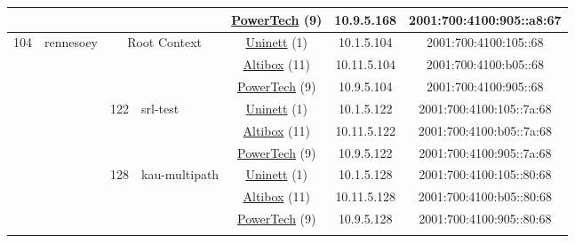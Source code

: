 \begin{small}
\begin{center}
\begin{longtable}{|c|c|c|c|c|c|c|c|}
  &  &  &  & \multicolumn{2}{|c|}{\tiny{\href{http://www.powertech.no}{PowerTech} (9)}} & \tiny{10.9.5.168} & \tiny{2001:700:4100:905::a8:67} \\ \hline
 \multirow{30}{*}{\tiny{104}} & \multicolumn{1}{|l|}{\multirow{30}{*}{\tiny{rennesoey}}} & \multicolumn{2}{|c|}{\multirow{3}{*}{\tiny{Root Context}}} & \multicolumn{2}{|c|}{\tiny{\href{https://www.uninett.no}{Uninett} (1)}} & \tiny{10.1.5.104} & \tiny{2001:700:4100:105::68} \\* \cline{5-5}\cline{6-6}\cline{7-7}\cline{8-8}
  &  & \multicolumn{2}{|c|}{} & \multicolumn{2}{|c|}{\tiny{\href{https://www.altibox.no}{Altibox} (11)}} & \tiny{10.11.5.104} & \tiny{2001:700:4100:b05::68} \\* \cline{5-5}\cline{6-6}\cline{7-7}\cline{8-8}
  &  & \multicolumn{2}{|c|}{} & \multicolumn{2}{|c|}{\tiny{\href{http://www.powertech.no}{PowerTech} (9)}} & \tiny{10.9.5.104} & \tiny{2001:700:4100:905::68} \\* \cline{3-3}\cline{4-4}\cline{5-5}\cline{6-6}\cline{7-7}\cline{8-8}
  &  & \multirow{3}{*}{\tiny{122}} & \multicolumn{1}{|l|}{\multirow{3}{*}{\tiny{srl-test}}} & \multicolumn{2}{|c|}{\tiny{\href{https://www.uninett.no}{Uninett} (1)}} & \tiny{10.1.5.122} & \tiny{2001:700:4100:105::7a:68} \\* \cline{5-5}\cline{6-6}\cline{7-7}\cline{8-8}
  &  &  &  & \multicolumn{2}{|c|}{\tiny{\href{https://www.altibox.no}{Altibox} (11)}} & \tiny{10.11.5.122} & \tiny{2001:700:4100:b05::7a:68} \\* \cline{5-5}\cline{6-6}\cline{7-7}\cline{8-8}
  &  &  &  & \multicolumn{2}{|c|}{\tiny{\href{http://www.powertech.no}{PowerTech} (9)}} & \tiny{10.9.5.122} & \tiny{2001:700:4100:905::7a:68} \\* \cline{3-3}\cline{4-4}\cline{5-5}\cline{6-6}\cline{7-7}\cline{8-8}
  &  & \multirow{3}{*}{\tiny{128}} & \multicolumn{1}{|l|}{\multirow{3}{*}{\tiny{kau-multipath}}} & \multicolumn{2}{|c|}{\tiny{\href{https://www.uninett.no}{Uninett} (1)}} & \tiny{10.1.5.128} & \tiny{2001:700:4100:105::80:68} \\* \cline{5-5}\cline{6-6}\cline{7-7}\cline{8-8}
  &  &  &  & \multicolumn{2}{|c|}{\tiny{\href{https://www.altibox.no}{Altibox} (11)}} & \tiny{10.11.5.128} & \tiny{2001:700:4100:b05::80:68} \\* \cline{5-5}\cline{6-6}\cline{7-7}\cline{8-8}
  &  &  &  & \multicolumn{2}{|c|}{\tiny{\href{http://www.powertech.no}{PowerTech} (9)}} & \tiny{10.9.5.128} & \tiny{2001:700:4100:905::80:68} \\* \cline{3-3}\cline{4-4}\cline{5-5}\cline{6-6}\cline{7-7}\cline{8-8}

\end{longtable}
\end{center}
\end{small}
